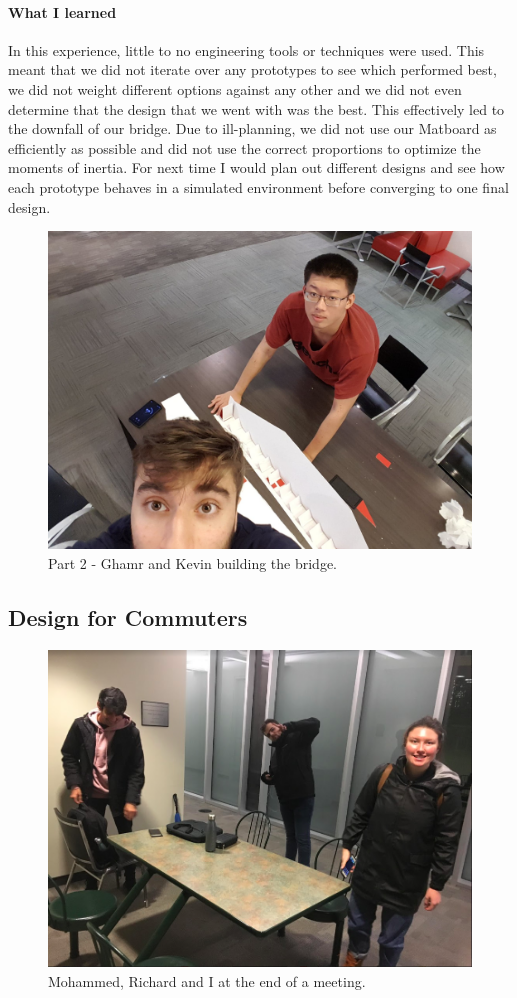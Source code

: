 \documentclass[paper=a4, fontsize=11pt]{article} %
\begin{document}
        \paragraph{What I learned}
        In this experience, little to no engineering tools or techniques were used. This meant that we did not iterate over any prototypes to see which performed best, we did not weight different options against any other and we did not even determine that the design that we went with was the best. This effectively led to the downfall of our bridge. Due to ill-planning, we did not use our Matboard as efficiently as possible and did not use the correct proportions to optimize the moments of inertia. For next time I would plan out different designs and see how each prototype behaves in a simulated environment before converging to one final design.
        \begin{figure}[H]
            \centering
            \includegraphics[width=0.6\linewidth]{bridge1.jpg}
            \caption{Part 2 - Ghamr and Kevin building the bridge.}
        \end{figure}

    
    \subsection{Design for Commuters}
        \begin{figure}[H]
            \centering
            \includegraphics[width=0.6\linewidth]{praxis13.png}
            \caption{Mohammed, Richard and I at the end of a meeting.}
        \end{figure}
\end{document}
